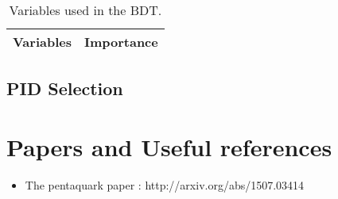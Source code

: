 \documentclass[11pt, oneside]{article}   	%
\begin{document}
\begin {table}[h]
\centering
\begin{tabular} {cc}
Variables & Importance \\
\hline

\end{tabular}
\caption{Variables used in the BDT.}
\end{table}


\subsection{PID Selection}
\label{sec:bdt}



\section{Papers and Useful references}
\begin{itemize}
\item The pentaquark paper : http://arxiv.org/abs/1507.03414

\end{itemize}
\end{document}
